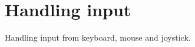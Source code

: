 \chapter{Handling input}\label{chapinput}
%
%
\setfooter{\thepage}{}{}{}{}{\thepage}%

Handling input from keyboard, mouse and joystick.


